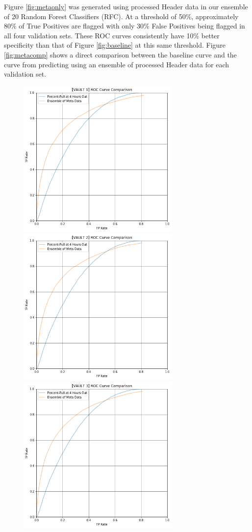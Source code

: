 \pagebreak

Figure \ref{fig:metaonly} was generated using processed Header data in our ensemble of 20 Random Forest Classifiers (RFC). At a threshold of 50\%, approximately 80\% of True Positives are flagged with only 30\% False Positives being flagged in all four validation sets. These ROC curves consistently have 10\% better specificity than that of Figure \ref{fig:baseline} at this same threshold. Figure \ref{fig:metacomp} shows a direct comparison between the baseline curve and the curve from predicting using an ensemble of processed Header data for each validation set.

\pagebreak

\begin{figure}[h]
\centering
\includegraphics[width=8cm]{body/results/Graphs/JustMeta/3.Compare/v1.png}
\includegraphics[width=8cm]{body/results/Graphs/JustMeta/3.Compare/v2.png}
\includegraphics[width=8cm]{body/results/Graphs/JustMeta/3.Compare/v3.png}

\end{figure}
